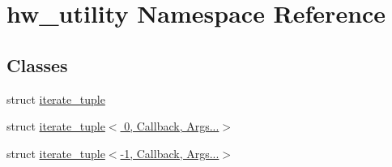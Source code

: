 \hypertarget{namespacehw__utility}{\section{hw\-\_\-utility Namespace Reference}
\label{namespacehw__utility}
}
\subsection*{Classes}
\begin{DoxyCompactItemize}
\item 
struct \hyperlink{structhw__utility_1_1iterate__tuple}{iterate\-\_\-tuple}
\item 
struct \hyperlink{structhw__utility_1_1iterate__tuple_3_010_00_01Callback_00_01Args_8_8_8_4}{iterate\-\_\-tuple$<$ 0, Callback, Args...$>$}
\item 
struct \hyperlink{structhw__utility_1_1iterate__tuple_3-1_00_01Callback_00_01Args_8_8_8_4}{iterate\-\_\-tuple$<$-\/1, Callback, Args...$>$}
\end{DoxyCompactItemize}
